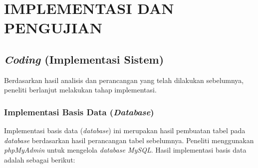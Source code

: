 
\chapter{IMPLEMENTASI DAN PENGUJIAN}
	\section{\emph{Coding} (Implementasi Sistem)}
	Berdasarkan hasil analisis dan perancangan yang telah dilakukan sebelumnya, peneliti berlanjut melakukan tahap implementasi.
	    \subsection{Implementasi Basis Data (\emph{Database})}
	    Implementasi basis data (\emph{database}) ini merupakan hasil pembuatan tabel pada \emph{database} berdasarkan hasil perancangan tabel sebelumnya. Peneliti menggunakan \emph{phpMyAdmin} untuk mengelola \emph{database MySQL}. Hasil implementasi basis data adalah sebagai berikut:
